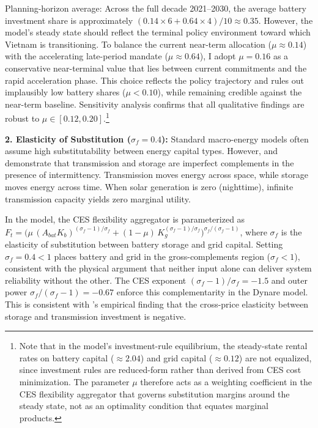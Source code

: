 \documentclass[12pt, a4paper]{article}
\begin{document}
	Planning-horizon average: Across the full decade 2021--2030, the average battery investment share is approximately $(0.14 \times 6 + 0.64 \times 4)/10 \approx 0.35$. However, the model's steady state should reflect the terminal policy environment toward which Vietnam is transitioning. To balance the current near-term allocation ($\mu \approx 0.14$) with the accelerating late-period mandate ($\mu \approx 0.64$), I adopt $\mu = 0.16$ as a conservative near-terminal value that lies between current commitments and the rapid acceleration phase. This choice reflects the policy trajectory and rules out implausibly low battery shares ($\mu < 0.10$), while remaining credible against the near-term baseline. Sensitivity analysis confirms that all qualitative findings are robust to $\mu \in [0.12, 0.20]$.\footnote{Note that in the model's investment-rule equilibrium, the steady-state rental rates on battery capital ($\approx 2.04$) and grid capital ($\approx 0.12$) are not equalized, since investment rules are reduced-form rather than derived from CES cost minimization. The parameter $\mu$ therefore acts as a weighting coefficient in the CES flexibility aggregator that governs substitution margins around the steady state, not as an optimality condition that equates marginal products.}
	
	\textbf{2. Elasticity of Substitution ($\sigma_f = 0.4$):}
	Standard macro-energy models often assume high substitutability between energy capital types. However, \citet{hart2019} and \citet{hirth2013} demonstrate that transmission and storage are imperfect complements in the presence of intermittency. Transmission moves energy across space, while storage moves energy across time. When solar generation is zero (nighttime), infinite transmission capacity yields zero marginal utility.
	
	In the model, the CES flexibility aggregator is parameterized as $F_t = \bigl(\mu\,(A_{bat}K_{b})^{(\sigma_f-1)/\sigma_f} + (1-\mu)\,K_{g}^{(\sigma_f-1)/\sigma_f}\bigr)^{\sigma_f/(\sigma_f-1)}$, where $\sigma_f$ is the elasticity of substitution between battery storage and grid capital. Setting $\sigma_f = 0.4 < 1$ places battery and grid in the gross-complements region ($\sigma_f < 1$), consistent with the physical argument that neither input alone can deliver system reliability without the other. The CES exponent $(\sigma_f - 1)/\sigma_f = -1.5$ and outer power $\sigma_f/(\sigma_f-1) = -0.67$ enforce this complementarity in the Dynare model. This is consistent with \citet{hart2019}'s empirical finding that the cross-price elasticity between storage and transmission investment is negative.
	
\end{document}
